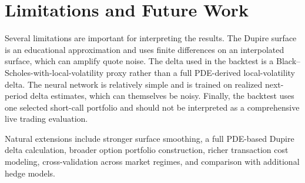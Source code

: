 \documentclass[11pt]{article}
\begin{document}
\section*{Limitations and Future Work}

Several limitations are important for interpreting the results. The Dupire
surface is an educational approximation and uses finite differences on an
interpolated surface, which can amplify quote noise. The delta used in the
backtest is a Black--Scholes-with-local-volatility proxy rather than a full
PDE-derived local-volatility delta. The neural network is relatively simple and
is trained on realized next-period delta estimates, which can themselves be
noisy. Finally, the backtest uses one selected short-call portfolio and should
not be interpreted as a comprehensive live trading evaluation.

Natural extensions include stronger surface smoothing, a full PDE-based Dupire
delta calculation, broader option portfolio construction, richer transaction
cost modeling, cross-validation across market regimes, and comparison with
additional hedge models.
\end{document}
